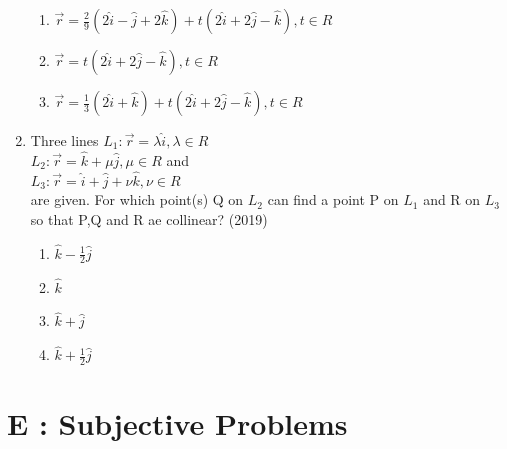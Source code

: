 \documentclass[12pt]{article}
\providecommand{\brak}[1]{\ensuremath{\left(#1\right)}}
\begin{document}
\begin{enumerate}
\begin{enumerate}
\item $\vec{r}=\frac{2}{9}\brak{2\hat{i}-\hat{j}+2\hat{k}}+t\brak{2\hat{i}+2\hat{j}-\hat{k}}, t \in R$
\item $\vec{r}=t\brak{2\hat{i}+2\hat{j}-\hat{k}},t \in R$
\item $\vec{r}=\frac{1}{3}\brak{2\hat{i}+\hat{k}}+t\brak{2\hat{i}+2\hat{j}-\hat{k}},t \in R$
\end{enumerate}
\item Three lines $L_1:\vec{r}=\lambda \hat{i},\lambda \in R$\\$L_2:\vec{r}=\hat{k}+\mu \hat{j}, \mu \in R$ and \\$L_3:\vec{r}=\hat{i}+\hat{j}+\nu \hat{k}, \nu \in R$\\ are given. For which point(s) Q on $L_2$  can find a point P on $L_1$ and R on $L_3$ so that P,Q and R ae collinear? (2019)
\begin{enumerate}
\item $\hat{k}-\frac{1}{2}\hat{j}$
\item $\hat{k}$
\item $\hat{k}+\hat{j}$
\item $\hat{k}+\frac{1}{2}\hat{j}$
\end{enumerate}
\end{enumerate}
\section*{E  :  Subjective Problems}
\end{document}
